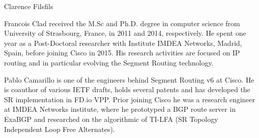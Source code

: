 \documentclass[10pt,journal,twocolumn]{IEEEtran}
\begin{document}
{\begin{IEEEbiography}{Clarence Filsfils}
\end{IEEEbiography}
\begin{IEEEbiography}{Francois Clad} received the M.Sc and Ph.D. degree in computer science from University of Strasbourg, France, in 2011 and 2014, respectively. He spent one year as a Post-Doctoral researcher with Institute IMDEA Networks, Madrid, Spain, before joining Cisco in 2015. His research activities are focused on IP routing and in particular evolving the Segment Routing technology.
\end{IEEEbiography}
\begin{IEEEbiography}{Pablo Camarillo} is one of the engineers behind Segment Routing v6 at Cisco. He is coauthor of various IETF drafts, holds several patents and has developed the SR implementation in FD.io VPP. Prior joining Cisco he was a research engineer at IMDEA Networks institute, where he prototyped a BGP route server in ExaBGP and researched on the algorithmic of TI-LFA (SR Topology Independent Loop Free Alternates).
\end{IEEEbiography}}
\end{document}
